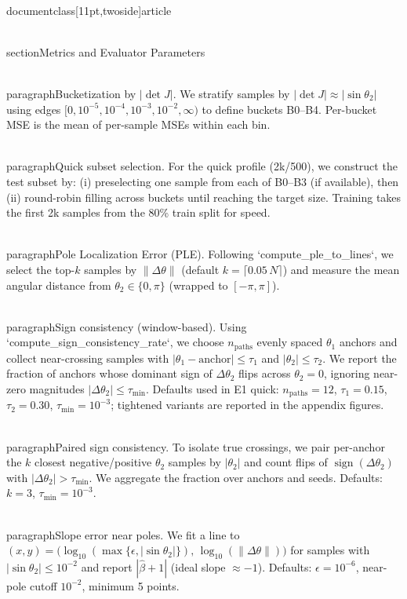 \\documentclass[11pt,twoside]{article}
\begin{document}
\
\\section{Metrics and Evaluator Parameters}

\\paragraph{Bucketization by $|\det J|$.} We stratify samples by $|\det J|\approx|\sin\theta_2|$ using edges $[0,10^{-5},10^{-4},10^{-3},10^{-2},\infty)$ to define buckets B0--B4. Per-bucket MSE is the mean of per-sample MSEs within each bin.

\\paragraph{Quick subset selection.} For the quick profile (2k/500), we construct the test subset by: (i) preselecting one sample from each of B0--B3 (if available), then (ii) round-robin filling across buckets until reaching the target size. Training takes the first 2k samples from the 80\% train split for speed.

\\paragraph{Pole Localization Error (PLE).} Following `compute_ple_to_lines`, we select the top-$k$ samples by $\|\Delta\theta\|$ (default $k=\lceil 0.05\,N\rceil$) and measure the mean angular distance from $\theta_2\in\{0,\pi\}$ (wrapped to $[-\pi,\pi]$).

\\paragraph{Sign consistency (window-based).} Using `compute_sign_consistency_rate`, we choose $n_\mathrm{paths}$ evenly spaced $\theta_1$ anchors and collect near-crossing samples with $|\theta_1-\text{anchor}|\le\tau_1$ and $|\theta_2|\le\tau_2$. We report the fraction of anchors whose dominant sign of $\Delta\theta_2$ flips across $\theta_2=0$, ignoring near-zero magnitudes $|\Delta\theta_2|\le\tau_\mathrm{min}$. Defaults used in E1 quick: $n_\mathrm{paths}=12$, $\tau_1=0.15$, $\tau_2=0.30$, $\tau_\mathrm{min}=10^{-3}$; tightened variants are reported in the appendix figures.

\\paragraph{Paired sign consistency.} To isolate true crossings, we pair per-anchor the $k$ closest negative/positive $\theta_2$ samples by $|\theta_2|$ and count flips of $\operatorname{sign}(\Delta\theta_2)$ with $|\Delta\theta_2|>\tau_\mathrm{min}$. We aggregate the fraction over anchors and seeds. Defaults: $k=3$, $\tau_\mathrm{min}=10^{-3}$.

\\paragraph{Slope error near poles.} We fit a line to $(x,y)=\big(\log_{10}(\max\{\epsilon,|\sin\theta_2|\}),\,\log_{10}(\|\Delta\theta\|)\big)$ for samples with $|\sin\theta_2|\le 10^{-2}$ and report $|\hat{\beta}+1|$ (ideal slope $\approx-1$). Defaults: $\epsilon=10^{-6}$, near-pole cutoff $10^{-2}$, minimum 5 points.
\end{document}
